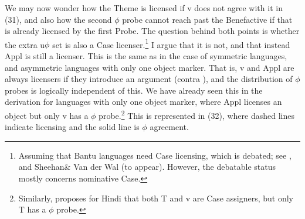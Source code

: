 \documentclass[output=paper
,modfonts
,nonflat]{langsci/langscibook}
\begin{document}
\begin{figure}[!h]
\begin{exe}
\end{exe} 
\end{figure} \newpage \noindent
We may now wonder how the Theme is licensed if v does not agree with it in (31), and also how the second $\phi$ probe cannot reach past the Benefactive if that is already licensed by the first Probe. The question behind both points is whether the extra u$\phi$ set is also a Case licenser.\footnote{Assuming that Bantu languages need Case licensing, which is debated; see \citet{Diercks2012}, \citet{Van_der_Wal2015} and Sheehan\& Van der Wal (to appear). However, the debatable status mostly concerns nominative Case.} I argue that it is not, and that instead Appl is still a licenser. This is the same as in the case of symmetric languages, and asymmetric languages with only one object marker. That is, v and Appl are always licensers if they introduce an argument (contra \citealt{Woolford1995}), and the distribution of $\phi$ probes is logically independent of this. We have already seen this in the derivation for languages with only one object marker, where Appl licenses an object but only v has a $\phi$ probe.\footnote{Similarly, \citet{Bhatt2005} proposes for Hindi that both T and v are Case assigners, but only T has a $\phi$ probe.} This is represented in (32), where dashed lines indicate licensing and the solid line is $\phi$ agreement.
\end{document}
